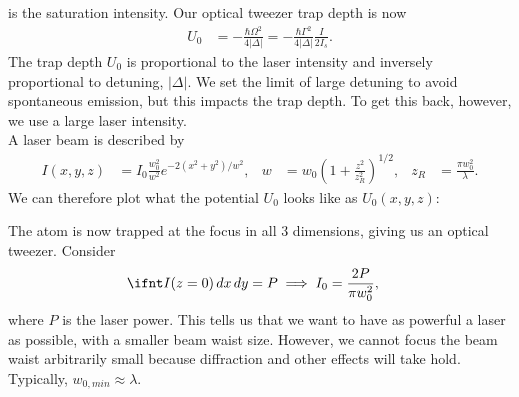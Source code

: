 \documentclass[a4paper, 11pt, normalem]{report}
\begin{document}
is the saturation intensity.
Our optical tweezer trap depth is now
\begin{align}
    U_0 &= -\frac{\hbar\Omega^2}{4|\Delta|} = -\frac{\hbar\Gamma^2}{4|\Delta|}\frac{I}{2I_s}.
\end{align}
The trap depth $U_0$ is proportional to the laser intensity and inversely proportional to detuning, $|\Delta|$.
We set the limit of large detuning to avoid spontaneous emission, but this impacts the trap depth.
To get this back, however, we use a large laser intensity. \\
A laser beam is described by
\begin{align}
    I(x,y,z) &= I_0\frac{w_0^2}{w^2}e^{-2(x^2+y^2)/w^2}, & w &= w_0\left(1+\frac{z^2}{z_R^2}\right)^{1/2}, & z_R &= \frac{\pi w_0^2}{\lambda}.
\end{align}
We can therefore plot what the potential $U_0$ looks like as $U_0(x,y,z)$:
\begin{figure}[H]
    \centering
\end{figure}
The atom is now trapped at the focus in all 3 dimensions, giving us an optical tweezer.
Consider
\begin{align}
    \ifnt I(z=0)\,dx\,dy &= P \implies I_0 = \frac{2P}{\pi w_0^2},
\end{align}
where $P$ is the laser power.
This tells us that we want to have as powerful a laser as possible, with a smaller beam waist size.
However, we cannot focus the beam waist arbitrarily small because diffraction and other effects will take hold.
Typically, $w_{0,min}\approx \lambda$.
\end{document}
